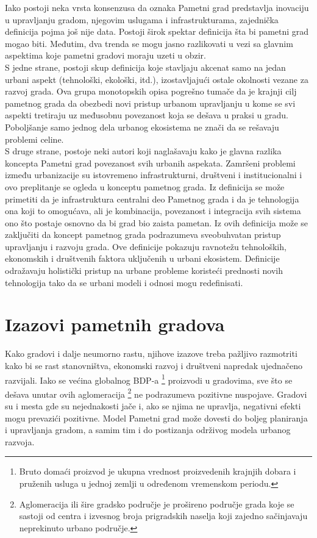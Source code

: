 \documentclass[a4paper,12pt]{article}
\begin{document}
{Iako postoji neka vrsta konsenzusa da oznaka Pametni grad predstavlja inovaciju u upravljanju gradom, njegovim uslugama i infrastrukturama, zajednička definicija pojma još nije data. Postoji širok spektar definicija šta bi pametni grad mogao biti. Međutim, dva trenda se mogu jasno razlikovati u vezi sa glavnim aspektima koje pametni gradovi moraju uzeti u obzir. \\

S jedne strane, postoji skup definicija koje stavljaju akcenat samo na jedan urbani aspekt (tehnološki, ekološki, itd.), izostavljajući ostale okolnosti vezane za razvoj grada. Ova grupa monotopskih opisa pogrešno tumače da je krajnji cilj pametnog grada da obezbedi novi pristup urbanom upravljanju u kome se svi aspekti tretiraju uz međusobnu povezanost koja se dešava u praksi u gradu. Poboljšanje samo jednog dela urbanog ekosistema ne znači da se rešavaju problemi celine. \\

S druge strane, postoje neki autori koji naglašavaju kako je glavna razlika koncepta Pametni grad povezanost svih urbanih aspekata. Zamršeni problemi između urbanizacije su istovremeno infrastrukturni, društveni i institucionalni i ovo preplitanje se ogleda u konceptu pametnog grada. Iz definicija se može primetiti da je infrastruktura centralni deo Pametnog grada i da je tehnologija ona koji to omogućava, ali je kombinacija, povezanost i integracija svih sistema ono što postaje osnovno da bi grad bio zaista pametan. Iz ovih definicija može se zaključiti da koncept pametnog grada podrazumeva sveobuhvatan pristup upravljanju i razvoju grada. Ove definicije pokazuju ravnotežu tehnoloških, ekonomskih i društvenih faktora uključenih u urbani ekosistem. Definicije odražavaju holistički pristup na urbane probleme koristeći prednosti novih tehnologija tako da se urbani modeli i odnosi mogu redefinisati.\\




\section{Izazovi pametnih gradova}	
\label{sec:termini_i_citiranje}


 Kako gradovi i dalje neumorno rastu, njihove izazove treba pažljivo razmotriti kako bi se rast stanovništva, ekonomski razvoj i društveni napredak ujednačeno razvijali. Iako se većina globalnog BDP-a \footnote{Bruto domaći proizvod je ukupna vrednost proizvedenih krajnjih dobara i pruženih usluga u jednoj zemlji u određenom vremenskom periodu. } proizvodi u gradovima, sve što se dešava unutar ovih aglomeracija \footnote{Aglomeracija ili šire gradsko područje je prošireno područje grada koje se sastoji od centra i izvesnog broja prigradskih naselja koji zajedno sačinjavaju neprekinuto urbano područje.
} ne podrazumeva pozitivne nuspojave. Gradovi su i mesta gde su nejednakosti jače i, ako se njima ne upravlja, negativni efekti mogu prevazići pozitivne. Model Pametni grad može dovesti do boljeg planiranja i upravljanja gradom, a samim tim i do postizanja održivog modela urbanog razvoja. \\

}
\end{document}
